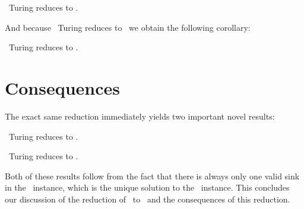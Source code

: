 \begin{theorem}
	\Tarskistar\ Turing reduces to \EndOfPotentialLine\@.
\end{theorem}
And because \Tarski\ Turing reduces to \Tarskistar\ we obtain the following corollary:
\begin{corollary}
	\Tarski\ Turing reduces to \EndOfPotentialLine\@.
\end{corollary}

\section{Consequences}

The exact same reduction immediately yields two important novel results:

\begin{corollary}
	\UniqueTarski\ Turing reduces to \UniqueEndOfPotentialLine\@.
\end{corollary}

\begin{corollary}
	\SuperUniqueTarski\ Turing reduces to \UniqueEndOfPotentialLine\@.
\end{corollary}

Both of these results follow from the fact that there is always only one valid sink in the \EndOfPotentialLine\ instance, which is the unique solution to the \Tarskistar\ instance. This concludes our discussion of the reduction of \Tarskistar\ to \EndOfPotentialLine\ and the consequences of this reduction.
